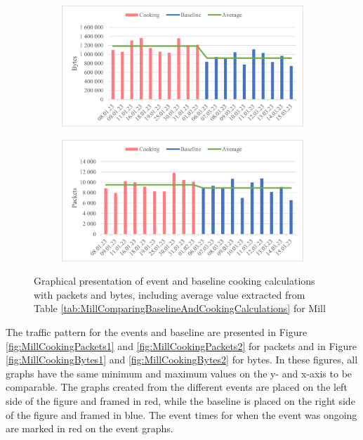 \begin{figure}[H]
    \centering
    \begin{subfigure}{0.8\textwidth}
        \centering
        \includegraphics[width=1\hsize]{figures/Mill_Cooking_Calculations_Bytes.png} 
    \end{subfigure}
    \begin{subfigure}{0.8\textwidth}
        \centering
        \includegraphics[width=1\hsize]{figures/Mill_Cooking_Calculations_Packets.png} 
    \end{subfigure}
    \caption{Graphical presentation of event and baseline cooking calculations
with packets and bytes, including average value extracted from Table \ref{tab:MillComparingBaselineAndCookingCalculations} for Mill}
    \label{fig:MillCookingCalculations}
\end{figure}

The traffic pattern for the events and baseline are presented in Figure \ref{fig:MillCookingPackets1} and \ref{fig:MillCookingPackets2} for packets and in Figure \ref{fig:MillCookingBytes1} and \ref{fig:MillCookingBytes2} for bytes. In these figures, all graphs have the same minimum and maximum values on the y- and x-axis to be comparable. The graphs created from the different events are placed on the left side of the figure and framed in red, while the baseline is placed on the right side of the figure and framed in blue. The event times for when the event was ongoing are marked in red on the event graphs.

